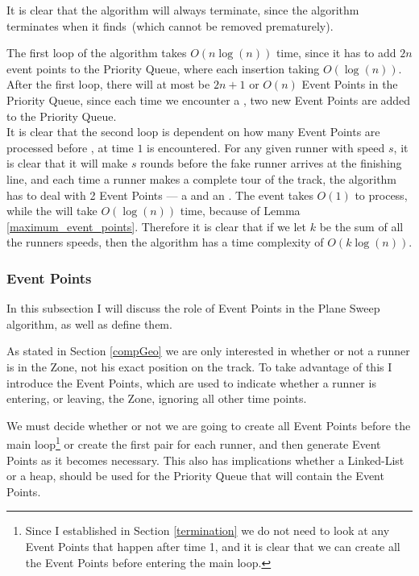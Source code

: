 \begin{theo}[Termination:]
It is clear that the algorithm will always terminate, since the algorithm terminates when it finds \comFin\,(which cannot be removed prematurely).
\end{theo}

\begin{theo}
The first loop of the algorithm takes $O(n\log(n))$ time, since it has to add $2n$ event points to the Priority Queue, where each insertion taking $O(\log(n))$.\\

After the first loop, there will at most be $2n + 1$ or $O(n)$ Event Points in the Priority Queue, since each time we encounter a \comEnd, two new Event Points are added to the Priority Queue.\\ 

It is clear that the second loop is dependent on how many Event Points are processed before \comFin, at time $1$ is encountered. For any given runner with speed $s$, it is clear that it will make $s$ rounds before the fake runner arrives at the finishing line, and each time  a runner makes a complete tour of the track, the algorithm has to deal with 2 Event Points --- a \comStart\; and an \comEnd. The \comStart\; event takes $O(1)$ to process, while the \comEnd\; will take $O(\log(n))$ time, because of Lemma \ref{maximum_event_points}. Therefore it is clear that if we let  $k$ be the sum of all the runners speeds, then the algorithm has a time complexity of $O(k\log(n))$.
\end{theo}

\subsubsection{Event Points}
\label{eventPoints}
In this subsection I will discuss the role of Event Points in the Plane Sweep algorithm, as well as define them. 

As stated in Section \ref{compGeo} we are only interested in whether or not a runner is in the Zone, not his exact position on the track. To take advantage of this I introduce the Event Points, which are used to indicate whether a runner is entering, or leaving, the Zone, ignoring all other time points. 

We must decide whether or not we are going to create all Event Points before the main loop\footnote{Since I established in Section \ref{termination} we do not need to look at any Event Points that happen after time 1, and it is clear that we can create all the Event Points before entering the main loop.} or create the first pair for each runner, and then generate Event Points as it becomes necessary. This also has implications whether a Linked-List or a heap, should be used for the Priority Queue that will contain the Event Points. 

